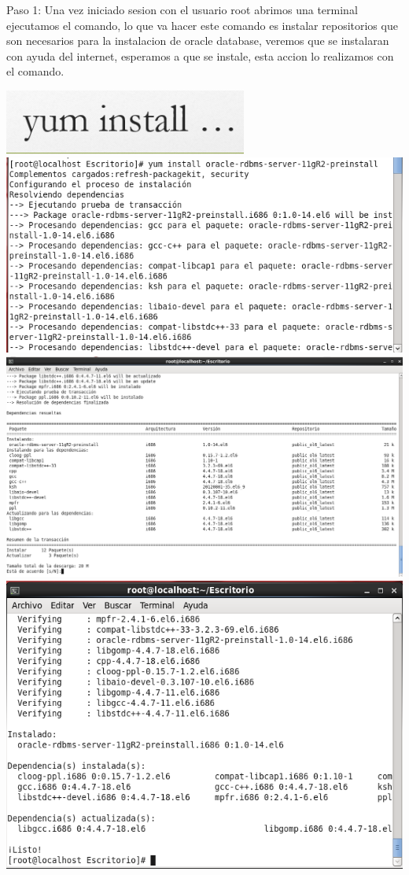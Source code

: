 \documentclass[12pt,letterpaper]{article}
\begin{document}
Paso 1: Una vez iniciado sesion con el usuario root abrimos una terminal ejecutamos el comando, lo que va hacer este comando es instalar repositorios que son necesarios para la instalacion de oracle database, veremos que se instalaran con ayuda del internet, esperamos a que se instale, esta accion lo realizamos con el comando. 
\begin{center}
\includegraphics[width=8cm]{./oraclelinux/Comando.png}
\includegraphics[width=15cm]{./oraclelinux/1.png}
\includegraphics[width=15cm]{./oraclelinux/2.png}
\includegraphics[width=15cm]{./oraclelinux/3.png}
\end{center}
\end{document}
